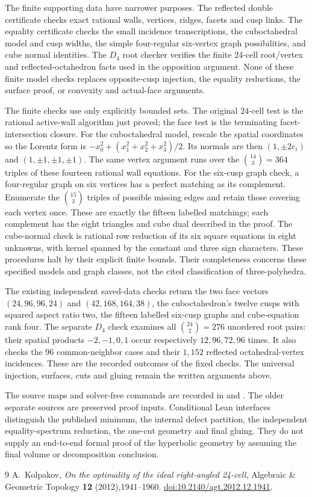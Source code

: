 \documentclass[11pt]{article}
\theoremstyle{remark}
\begin{document}
The finite supporting data have narrower purposes. The reflected
double certificate checks exact rational walls, vertices, ridges,
facets and cusp links. The equality certificate checks the small
incidence transcriptions, the cuboctahedral model and cusp widths,
the simple four-regular six-vertex graph possibilities, and cube
normal identities. The $D_4$ root checker verifies the finite
24-cell root/vertex and reflected-octahedron facts used in the
opposition argument. None of these finite model checks replaces
opposite-cusp injection, the equality reductions, the surface proof,
or convexity and actual-face arguments.

The finite checks use only explicitly bounded sets. The original
$24$-cell test is the rational active-wall algorithm just proved;
the face test is the terminating facet-intersection closure. For the
cuboctahedral model, rescale the spatial coordinates so the Lorentz
form is $-x_0^2+(x_1^2+x_2^2+x_3^2)/2$. Its normals are then
$(1,\pm2e_i)$ and $(1,\pm1,\pm1,\pm1)$. The same vertex argument
runs over the $\binom{14}{3}=364$ triples of these fourteen rational
wall equations. For the six-cusp graph check, a
four-regular graph on six vertices has a perfect matching as its
complement. Enumerate the $\binom{15}{3}$ triples of possible missing
edges and retain those covering each vertex once. These are exactly
the fifteen labelled matchings; each complement has the eight
triangles and cube dual described in the proof. The cube-normal
check is rational row reduction of its six square equations in
eight unknowns, with kernel spanned by the constant and three sign
characters. These procedures halt by their explicit finite bounds.
Their completeness concerns these specified models and graph classes,
not the cited classification of three-polyhedra.

The existing independent saved-data checks return the two face vectors
$(24,96,96,24)$ and $(42,168,164,38)$, the cuboctahedron's twelve
cusps with squared aspect ratio two, the fifteen labelled six-cusp
graphs and cube-equation rank four. The separate $D_4$ check examines
all $\binom{24}{2}=276$ unordered root pairs: their spatial products
$-2,-1,0,1$ occur respectively $12,96,72,96$ times. It also checks
the $96$ common-neighbor cases and their $1,152$ reflected
octahedral-vertex incidences. These are the recorded outcomes of
the fixed checks. The universal injection, surfaces, cuts and gluing
remain the written arguments above.

The source maps and solver-free commands are recorded in
 and
. The older separate sources are
preserved proof inputs. Conditional Lean interfaces distinguish the
published minimum, the internal defect partition, the independent
equality-spectrum reduction, the one-cut geometry and final gluing.
They do not supply an end-to-end formal proof of the hyperbolic
geometry by assuming the final volume or decomposition conclusion.

\begin{thebibliography}{9}
A.~Kolpakov, \emph{On the optimality of the ideal right-angled 24-cell},
Algebraic \& Geometric Topology \textbf{12} (2012),1941--1960.
\href{https://doi.org/10.2140/agt.2012.12.1941}{doi:10.2140/agt.2012.12.1941}.
\end{thebibliography}
\end{document}
